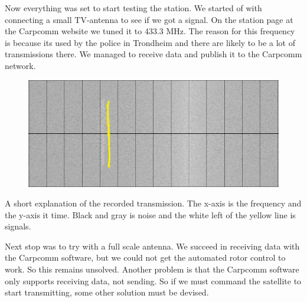 Now everything was set to start testing the station. We started of with connecting a small TV-antenna to see if we got a signal. On the station page at the Carpcomm website we tuned it to 433.3 MHz. The reason for this  frequency is because its used by the police in Trondheim and there are likely to be a lot of transmissions there.  We managed to receive data and publish it to the Carpcomm network.

\begin{figure}
\centering
\includegraphics[width=\textwidth]{Figures/sattelite_transmition}
\label{fig: Transmission}
\end{figure}
A short explanation of the recorded transmission. The x-axis is the frequency and the y-axis it time. Black and gray is noise and the white left of the yellow line is signals.

Next stop was to try with a full scale antenna. We succeed in receiving data with the Carpcomm software, but we could not get the automated rotor control to work. So this remains unsolved. Another problem is that the Carpcomm software only supports receiving data, not sending. So if we must command the satellite to start transmitting, some other solution must be devised. 




